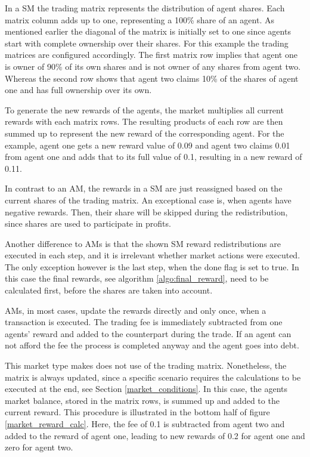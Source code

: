 In a SM the trading matrix represents the distribution of agent shares. Each matrix column adds up to one, representing a 100\% share of an agent. As mentioned earlier the diagonal of the matrix is initially set to one since agents start with complete ownership over their shares. For this example the trading matrices are configured accordingly. The first matrix row implies that agent one is owner of 90\% of its own shares and is not owner of any shares from agent two. Whereas the second row shows that agent two claims 10\% of the shares of agent one and has full ownership over its own.

To generate the new rewards of the agents, the market multiplies all current rewards with each matrix rows. The resulting products of each row are then summed up to represent the new reward of the corresponding agent. For the example, agent one gets a new reward value of 0.09 and agent two claims 0.01 from agent one and adds that to its full value of 0.1, resulting in a new reward of 0.11. 

In contrast to an AM, the rewards in a SM are just reassigned based on the current shares of the trading matrix. An exceptional case is, when agents have negative rewards. Then, their share will be skipped during the redistribution, since shares are used to participate in profits. 

Another difference to AMs is that the shown SM reward redistributions are executed in each step, and it is irrelevant whether market actions were executed. The only exception however is the last step, when the done flag is set to true. In this case the final rewards, see algorithm \ref{algo:final_reward}, need to be calculated first, before the shares are taken into account.

AMs, in most cases, update the rewards directly and only once, when a transaction is executed. The trading fee is immediately subtracted from one agents' reward and added to the counterpart during the trade. If an agent can not afford the fee the process is completed anyway and the agent goes into debt. 

This market type makes does not use of the trading matrix. Nonetheless, the matrix is always updated, since a specific scenario requires the calculations to be executed at the end, see Section \ref{market_conditions}. In this case, the agents market balance, stored in the matrix rows, is summed up and added to the current reward. This procedure is illustrated in the bottom half of figure \ref{market_reward_calc}. Here, the fee of 0.1 is subtracted from agent two and added to the reward of agent one, leading to new rewards of 0.2 for agent one and zero for agent two.

